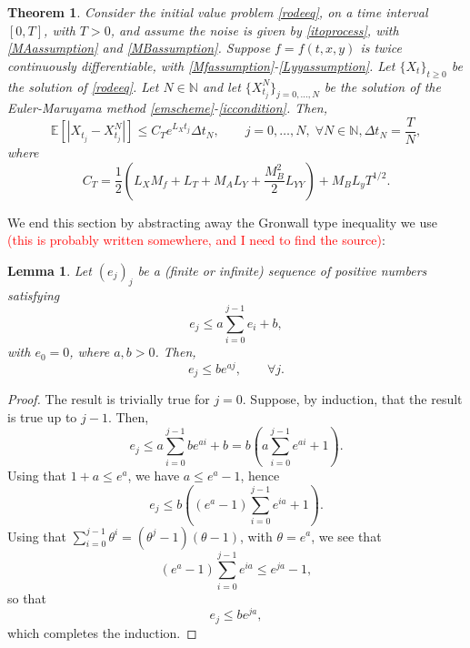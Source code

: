 \documentclass[reqno,12pt]{amsart}
\theoremstyle{plain}%
\newtheorem{thm}{Theorem}[section]
\newtheorem{lem}{Lemma}[section]
\theoremstyle{definition}
\begin{document}
\begin{thm}
  \label{EMstrongorder1}
  Consider the initial value problem \eqref{rodeeq}, on a time interval $[0, T]$, with $T > 0$, and assume the noise is given by \eqref{itoprocess}, with \eqref{MAassumption} and \eqref{MBassumption}. Suppose $f=f(t, x, y)$ is twice continuously differentiable, with \eqref{Mfassumption}-\eqref{Lyyassumption}. Let $\{X_t\}_{t\geq 0}$ be the solution of \eqref{rodeeq}. Let $N\in \mathbb{N}$ and let $\{X_{t_j}^N\}_{j=0, \ldots, N}$ be the solution of the Euler-Maruyama method \eqref{emscheme}-\eqref{iccondition}. Then,
  \begin{equation}
  \mathbb{E}\left[ \left| X_{t_j} - X_{t_j}^N \right| \right] \leq C_T e^{L_X t_j} \Delta t_N, \qquad j = 0, \ldots, N, \;\forall N \in \mathbb{N},  \Delta t_N = \frac{T}{N},
\end{equation}
  where
  \begin{equation}
    C_T = \frac{1}{2}\left(L_X M_f + L_T + M_A L_Y  + \frac{M_B^2}{2}L_{YY} \right) + M_B L_yT^{1/2}.
  \end{equation}
\end{thm}

We end this section by abstracting away the Gronwall type inequality we use \textcolor{red}{(this is probably written somewhere, and I need to find the source)}:
\begin{lem}
Let $(e_j)_j$ be a (finite or infinite) sequence of positive numbers satisfying
\begin{equation}
  \label{integralgronwall}
  e_j \leq a \sum_{i=0}^{j-1} e_i + b,
\end{equation}
with $e_0 = 0$, where $a, b > 0$. Then,
\begin{equation}
  \label{estimateintegralgronwall}
  e_j \leq b e^{aj}, \qquad \forall j.
\end{equation}
\end{lem}

\begin{proof}
  The result is trivially true for $j=0$. Suppose, by induction, that the result is true up to $j-1$. Then,
  $$
  e_j \leq a \sum_{i=0}^{j-1} be^{ai} + b = b \left(a \sum_{i=0}^{j-1} e^{ai} + 1\right).
  $$
  Using that $1 + a \leq e^a$, we have $a \leq e^a - 1$, hence
  $$
  e_j \leq b\left((e^a - 1)\sum_{i=0}^{j-1} e^{ia} + 1\right).
  $$
  Using that $\sum_{i=0}^{j-1} \theta^i = (\theta^j - 1)(\theta - 1)$, with $\theta = e^a$, we see that
  $$
  (e^a - 1)\sum_{i=0}^{j-1} e^{ia} \leq e^{ja} - 1,
  $$
  so that
  $$
  e_j \leq be^{ja},
  $$
  which completes the induction.
\end{proof}
\end{document}
